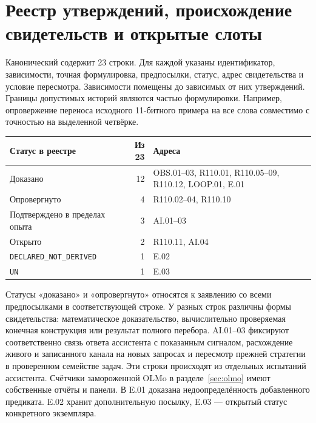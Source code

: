 \section{Реестр утверждений, происхождение свидетельств и открытые слоты}
\label{app:registers}

Канонический 
содержит 23 строки. Для каждой указаны идентификатор, зависимости, точная
формулировка, предпосылки, статус, адрес свидетельства и условие пересмотра.
Зависимости помещены до зависимых от них утверждений. Границы допустимых
историй являются частью формулировки. Например, опровержение переноса
исходного 11-битного примера на все слова совместимо с точностью на
выделенной четвёрке.

\begin{center}
\begin{tabularx}{\linewidth}{@{}l r X@{}}
\toprule
Статус в реестре & Из 23 & Адреса \\
\midrule
Доказано & 12 & OBS.01--03, R110.01, R110.05--09, R110.12, LOOP.01, E.01 \\
Опровергнуто & 4 & R110.02--04, R110.10 \\
Подтверждено в пределах опыта & 3 & AI.01--03 \\
Открыто & 2 & R110.11, AI.04 \\
\texttt{DECLARED\_NOT\_DERIVED} & 1 & E.02 \\
\texttt{UN} & 1 & E.03 \\
\bottomrule
\end{tabularx}
\end{center}

Статусы «доказано» и «опровергнуто» относятся к заявлению со всеми
предпосылками в соответствующей строке. У разных строк различны формы
свидетельства: математическое доказательство, вычислительно проверяемая
конечная конструкция или результат полного перебора. AI.01--03 фиксируют
соответственно связь ответа ассистента с показанным сигналом, расхождение
живого и записанного канала на новых запросах и пересмотр прежней стратегии
в проверенном семействе задач. Эти строки происходят из отдельных
испытаний ассистента. Счётчики замороженной OLMo в разделе~\ref{sec:olmo}
имеют собственные отчёты и панели. В E.01 доказана недоопределённость
добавленного предиката. E.02 хранит дополнительную посылку, E.03 ---
открытый статус конкретного экземпляра.

